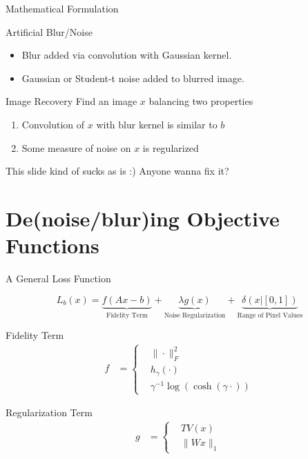 \documentclass[12pt]{beamer}
\begin{document}
\begin{frame}{Mathematical Formulation}

\begin{exampleblock}{Artificial Blur/Noise}
\begin{itemize}
\item Blur added via convolution with Gaussian kernel.
\item Gaussian or Student-t noise added to blurred image.
\end{itemize}
\end{exampleblock}

\begin{exampleblock}{Image Recovery}
Find an image $x$ balancing two properties
\begin{enumerate}
\item Convolution of $x$ with blur kernel is similar to $b$
\item Some measure of noise on $x$ is regularized
\end{enumerate}
\end{exampleblock}

This slide kind of sucks as is :)  Anyone wanna fix it?

\end{frame}

\section{De(noise/blur)ing Objective Functions}

\begin{frame}{A General Loss Function}

$$
L_b(x) = \underbrace{f(Ax-b)}_{\text{Fidelity Term}} + \underbrace{\lambda g(x)}_{\text{Noise Regularization}} + \underbrace{\delta(x | [0,1])}_{\text{Range of Pixel Values}}
$$

\begin{exampleblock}{Fidelity Term}
\vspace{-5 mm}
\begin{align*}
f &= \left\{ \begin{aligned}
&\|\cdot \|_F^2 \\
& h_\gamma (\cdot)\\
& \gamma^{-1} \log ( \cosh (\gamma \cdot ))
\end{aligned}\right.
\end{align*}
\end{exampleblock}

\begin{exampleblock}{Regularization Term}
\vspace{-5 mm}
\begin{align*}
g &= \left\{ \begin{aligned}
&TV(x) \\
& \| Wx\|_1
\end{aligned}\right.
\end{align*}
\end{exampleblock}

\end{frame}
\end{document}
